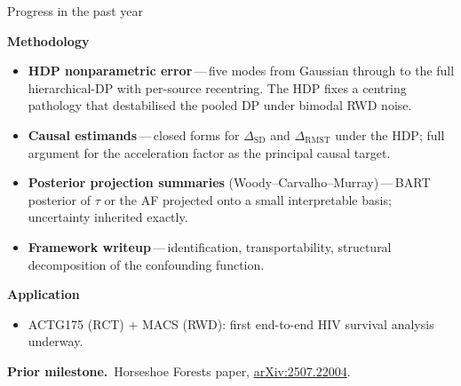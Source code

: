 \documentclass[10pt,aspectratio=169]{beamer}
\newcommand{\CATE}{\tau}
\newcommand{\SD}{\mathrm{SD}}
\newcommand{\RMST}{\mathrm{RMST}}
\begin{document}
\begin{frame}{Progress in the past year}

\textbf{Methodology}
\begin{itemize}
  \item \textbf{HDP nonparametric error}\,---\,five modes from Gaussian
        through to the full hierarchical-DP with per-source recentring.
        The HDP fixes a centring pathology that destabilised the pooled
        DP under bimodal RWD noise.
  \item \textbf{Causal estimands}\,---\,closed forms for
        $\Delta_{\SD}$ and $\Delta_{\RMST}$ under the HDP; full
        argument for the acceleration factor as the principal causal
        target.
  \item \textbf{Posterior projection summaries}
        (Woody--Carvalho--Murray)\,---\,BART posterior of $\CATE$ or
        the AF projected onto a small interpretable basis; uncertainty
        inherited exactly.
  \item \textbf{Framework writeup}\,---\,identification,
        transportability, structural decomposition of the confounding
        function.
\end{itemize}

\textbf{Application}
\begin{itemize}
  \item ACTG175 (RCT) $+$ MACS (RWD): first end-to-end HIV survival
        analysis underway.
\end{itemize}

\textbf{Prior milestone.}\ Horseshoe Forests paper,
\href{https://arxiv.org/abs/2507.22004}{arXiv:2507.22004}.

\end{frame}
\end{document}
